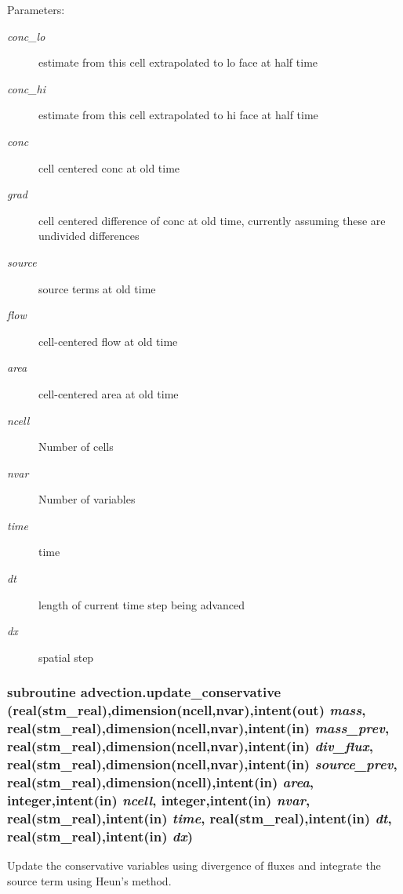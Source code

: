 \begin{Desc}
\item[Parameters:]
\begin{description}
\item[{\em conc\_\-lo}]estimate from this cell extrapolated to lo face at half time\item[{\em conc\_\-hi}]estimate from this cell extrapolated to hi face at half time\item[{\em conc}]cell centered conc at old time\item[{\em grad}]cell centered difference of conc at old time, currently assuming these are undivided differences\item[{\em source}]source terms at old time\item[{\em flow}]cell-centered flow at old time\item[{\em area}]cell-centered area at old time\item[{\em ncell}]Number of cells\item[{\em nvar}]Number of variables\item[{\em time}]time\item[{\em dt}]length of current time step being advanced\item[{\em dx}]spatial step \end{description}
\end{Desc}
\hypertarget{a00052_8d00316cd8f52a398f27fa60b0ded0de}{
\subsubsection[{update\_\-conservative}]{\setlength{\rightskip}{0pt plus 5cm}subroutine advection.update\_\-conservative (real(stm\_\-real),dimension(ncell,nvar),intent(out) {\em mass}, \/  real(stm\_\-real),dimension(ncell,nvar),intent(in) {\em mass\_\-prev}, \/  real(stm\_\-real),dimension(ncell,nvar),intent(in) {\em div\_\-flux}, \/  real(stm\_\-real),dimension(ncell,nvar),intent(in) {\em source\_\-prev}, \/  real(stm\_\-real),dimension(ncell),intent(in) {\em area}, \/  integer,intent(in) {\em ncell}, \/  integer,intent(in) {\em nvar}, \/  real(stm\_\-real),intent(in) {\em time}, \/  real(stm\_\-real),intent(in) {\em dt}, \/  real(stm\_\-real),intent(in) {\em dx})}}
\label{a00052_8d00316cd8f52a398f27fa60b0ded0de}


Update the conservative variables using divergence of fluxes and integrate the source term using Heun's method. 


